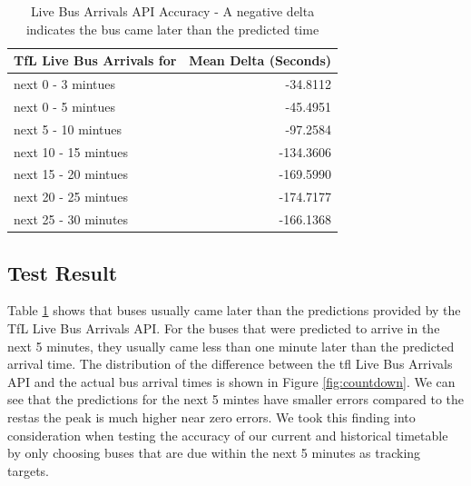 \begin{table}
\centering
\begin{tabular}{@{}lr@{}} \toprule
TfL Live Bus Arrivals for & Mean Delta (Seconds) \\ \midrule
next 0 - 3 mintues & -34.8112 \\
next 0 - 5 mintues & -45.4951 \\
next 5 - 10 mintues & -97.2584 \\
next 10 - 15 mintues & -134.3606 \\
next 15 - 20 mintues & -169.5990 \\
next 20 - 25 mintues & -174.7177 \\
next 25 - 30 minutes & -166.1368 \\
\bottomrule
\end{tabular}
\caption{Live Bus Arrivals API Accuracy - A negative delta indicates the bus came later than the predicted time}
\label{table:countdown_evaluation}
\end{table}

\subsection{Test Result}
\par Table \ref{table:countdown_evaluation} shows that buses usually came later than the predictions provided by the TfL Live Bus Arrivals API. For the buses that were predicted to arrive in the next 5 minutes, they usually came less than one minute later than the predicted arrival time. The distribution of the difference between the \acrshort{tfl} Live Bus Arrivals API and the actual bus arrival times is shown in Figure \ref{fig:countdown}. We can see that the predictions for the next 5 mintes have smaller errors compared to the restas the peak is much higher near zero errors. We took this finding into consideration when testing the accuracy of our current and historical timetable by only choosing buses that are due within the next 5 minutes as tracking targets.

